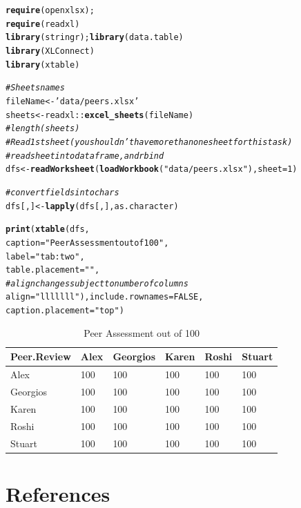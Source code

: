 \documentclass[10pt]{article}\usepackage[]{graphicx}\usepackage[]{color}
\makeatletter
\newcommand{\hlnum}[1]{\textcolor[rgb]{0.686,0.059,0.569}{#1}}%
\newcommand{\hlstr}[1]{\textcolor[rgb]{0.192,0.494,0.8}{#1}}%
\newcommand{\hlcom}[1]{\textcolor[rgb]{0.678,0.584,0.686}{\textit{#1}}}%
\newcommand{\hlopt}[1]{\textcolor[rgb]{0,0,0}{#1}}%
\newcommand{\hlstd}[1]{\textcolor[rgb]{0.345,0.345,0.345}{#1}}%
\newcommand{\hlkwb}[1]{\textcolor[rgb]{0.69,0.353,0.396}{#1}}%
\newcommand{\hlkwc}[1]{\textcolor[rgb]{0.333,0.667,0.333}{#1}}%
\newcommand{\hlkwd}[1]{\textcolor[rgb]{0.737,0.353,0.396}{\textbf{#1}}}%
\newenvironment{kframe}{%
 \def\at@end@of@kframe{}%
 \ifinner\ifhmode%
  \def\at@end@of@kframe{\end{minipage}}%
  \begin{minipage}{\columnwidth}%
 \fi\fi%
 \def\FrameCommand##1{\hskip\@totalleftmargin \hskip-\fboxsep
 \colorbox{shadecolor}{##1}\hskip-\fboxsep
     \hskip-\linewidth \hskip-\@totalleftmargin \hskip\columnwidth}%
 \MakeFramed {\advance\hsize-\width
   \@totalleftmargin\z@ \linewidth\hsize
   \@setminipage}}%
 {\par\unskip\endMakeFramed%
 \at@end@of@kframe}
\makeatother
\begin{document}
\begin{kframe}
\begin{alltt}
\hlkwd{require}\hlstd{(openxlsx);}
\hlkwd{require}\hlstd{(readxl)}
\hlkwd{library}\hlstd{(stringr);}\hlkwd{library}\hlstd{(data.table)}
\hlkwd{library}\hlstd{(XLConnect)}
\hlkwd{library}\hlstd{(xtable)}

\hlcom{# Sheets names }
\hlstd{fileName} \hlkwb{<-} \hlstr{'data/peers.xlsx'}
\hlstd{sheets} \hlkwb{<-} \hlstd{readxl}\hlopt{::}\hlkwd{excel_sheets}\hlstd{(fileName)}
\hlcom{#length(sheets)}
\hlcom{# Read 1st sheet (you shouldn't have more than one sheet for this task)}
\hlcom{# read sheet into dataframe, and rbind}
\hlstd{dfs} \hlkwb{<-} \hlkwd{readWorksheet}\hlstd{(}\hlkwd{loadWorkbook}\hlstd{(}\hlstr{"data/peers.xlsx"}\hlstd{),}\hlkwc{sheet}\hlstd{=}\hlnum{1}\hlstd{)}

\hlcom{# convert fields into chars}
\hlstd{dfs[, ]} \hlkwb{<-} \hlkwd{lapply}\hlstd{(dfs[, ], as.character)}

\hlkwd{print}\hlstd{(}\hlkwd{xtable}\hlstd{(dfs,}
                    \hlkwc{caption} \hlstd{=} \hlstr{"Peer Assessment out of 100"}\hlstd{,}
                    \hlkwc{label} \hlstd{=} \hlstr{"tab:two"}\hlstd{,}
                    \hlkwc{table.placement} \hlstd{=} \hlstr{""}\hlstd{,}
                    \hlcom{# align changes subject to number of columns }
                    \hlkwc{align} \hlstd{=} \hlstr{"lllllll"}\hlstd{),}\hlkwc{include.rownames}\hlstd{=}\hlnum{FALSE}\hlstd{,}
                    \hlkwc{caption.placement} \hlstd{=} \hlstr{"top"}\hlstd{)}
\end{alltt}
\end{kframe}%
\begin{table}[ht]
\centering
\caption{Peer Assessment out of 100} 
\label{tab:two}
\begin{tabular}{llllll}
  \hline
Peer.Review & Alex & Georgios & Karen & Roshi & Stuart \\ 
  \hline
Alex & 100 & 100 & 100 & 100 & 100 \\ 
  Georgios & 100 & 100 & 100 & 100 & 100 \\ 
  Karen & 100 & 100 & 100 & 100 & 100 \\ 
  Roshi & 100 & 100 & 100 & 100 & 100 \\ 
  Stuart & 100 & 100 & 100 & 100 & 100 \\ 
   \hline
\end{tabular}
\end{table}



\pagebreak
\section*{References}\label{pubs}
\printbibliography[heading=none]
\end{document}
